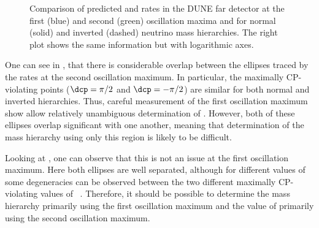 \begin{figure}[h]
  \begin{minipage}[t]{0.5\textwidth}
    \begin{adjustbox}{max totalsize={\textwidth}, center}
      
    \end{adjustbox}
  \end{minipage}
  \hfill
  \begin{minipage}[t]{0.5\textwidth}
    \begin{adjustbox}{max totalsize={\textwidth}, center}
      
    \end{adjustbox}
  \end{minipage}
  \caption[Predicted \nue and \anue rates for different values of \dcp and neutrino mass hierarchies at the first and second oscillation maxima.]{Comparison of predicted \nue and \anue rates in the DUNE far detector at the first (blue) and second (green) oscillation maxima and for normal (solid) and inverted (dashed) neutrino mass hierarchies. The right plot shows the same information but with logarithmic axes.}
  \label{fig:nueRates}
\end{figure}

One can see in , that there is considerable overlap between the ellipses traced by the rates at the second oscillation maximum.
In particular, the maximally CP-violating points ($\dcp=\pi/2$ and $\dcp=-\pi/2$) are similar for both normal and inverted hierarchies.
Thus, careful measurement of the first oscillation maximum show allow relatively unambiguous determination of \dcp.
However, both of these ellipses overlap significant with one another, meaning that determination of the mass hierarchy using only this region is likely to be difficult.

Looking at , one can observe that this is not an issue at the first oscillation maximum.
Here both ellipses are well separated, although for different values of  some degeneracies can be observed between the two different maximally CP-violating values of \dcp~\cite{twoExperiments}.
Therefore, it should be possible to determine the mass hierarchy primarily using the first oscillation maximum and the value of \dcp primarily using the second oscillation maximum.

